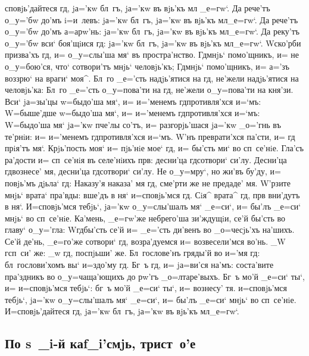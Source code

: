\documentclass[12pt,a6paper,twoside,dvips,civil=antiqua,cs=pochaev]{hipbook}
\begin{document}
сповjь'дайтеся гд, jа='кw бл~гъ, jа='кw въ вjь'къ мл
_е=гw`. Да рече'тъ о_у='бw до'мъ i=и~левъ: jа='кw бл~гъ, jа='кw въ вjь'къ
мл _е=гw`. Да рече'тъ о_у='бw до'мъ а=арw'нь: jа='кw бл~гъ, jа='кw въ
вjь'къ мл _е=гw`. Да реку'тъ о_у='бw вси` боя'щiися гд: jа='кw бл~гъ,
jа='кw въ вjь'къ мл _е=гw`. W\т ско'рби призва'хъ гд, и= о_у=слы'ша мя`
въ простра'нство. Гд мнjь` помо'щникъ, и= не о_у=бою'ся, что` сотвори'тъ
мнjь` человjь'къ; Гд мнjь` помо'щникъ, и= а='зъ воззрю` на враги`
моя^. Бл~го _е='сть надjь'ятися на гд, не'жели надjь'ятися на человjь'ка:
Бл~го _е='сть о_у=пова'ти на гд, не'жели о_у=пова'ти на кня'зи. Вси`
jа=зы'цы w=быдо'ша мя`, и= и='менемъ гд противля'хся и=`мъ: W=быше'дше
w=бы\-до'\-ша мя`, и= и='менемъ гд противля'хся и=`мъ: W=быдо'ша мя` jа='кw
пче'лы со'тъ, и= разгорjь'шася jа='кw _о='гнь въ те'рнiи: и= и='ме\-немъ
гд противля'хся и=`мъ. W'нъ преврати'хся па'сти, и= гд
прiя'тъ мя`. Крjь'\-пость моя` и= пjь'нiе мое` гд, и= бы'сть ми` во
сп~се'нiе. Гла'съ ра'дости и= сп~се'нiя въ се\-ле'\-нiихъ прв: десни'ца
гд сотвори` си'лу. Десни'ца гд вознесе' мя, десни'ца гд сотвори`
си'лу. Не о_у=мру`, но жи'въ бу'ду, и= повjь'мъ дjьла` гд: Наказу'я
на\-ка\-за' мя гд, сме'рти же не предаде' мя. W'рзите мнjь` врата`
пра'вды: вше'дъ в ня` и=сповjь'мся гд. Сiя^ врата^ гд, прв
вни'дутъ в ня`. И=сповjь'мся тебjь`, jа='кw о_у=слы'шалъ мя` _е=си`, и= бы'лъ
_е=си` мнjь` во сп~се'нiе. Ка'мень, _е=гw'же небрего'ша зи'ждущiи, се'й
бы'сть во гла\-ву` о_у='гла: W\т гд бы'сть се'й и= _е='сть ди'\-венъ во
_о=чесjь'хъ на'шихъ. Се'й де'нь, _е=го'\-же сотвори` гд, возра'дуемся и=
возвесели'мся во'нь. _W г сп~си' же: _w гд, по\-спjь\-ши' же. Бл~гослове'нъ
гряды'й во и='мя гд: бл~го\-сло\-ви'\-хомъ вы` и=з\ъ до'му гд. Бг~ъ гд,
и= jа=ви'ся на'мъ: соста'вите пра'здникъ во о_у=\-ча\-ща'\-ю\-щихъ до рw'гъ
_о=лтаре'выхъ. Бг~ъ мо'й _е=си` ты`, и= и=сповjь'мся тебjь`: бг~ъ мо'й _е=си`
ты`, и= вознесу' тя. и=сповjь'мся тебjь`, jа='кw о_у=\-слы'\-шалъ мя` _е=си`, и=
бы'лъ _е=си` мнjь` во сп~се'нiе. И=сповjь'дайтеся гд, jа='кw бл~гъ,
jа='кw въ вjь'къ мл _е=гw`.

\slava

\delimpict

\subsection{По s~_i-й каf_i'смjь, трист~о'е}
\end{document}
